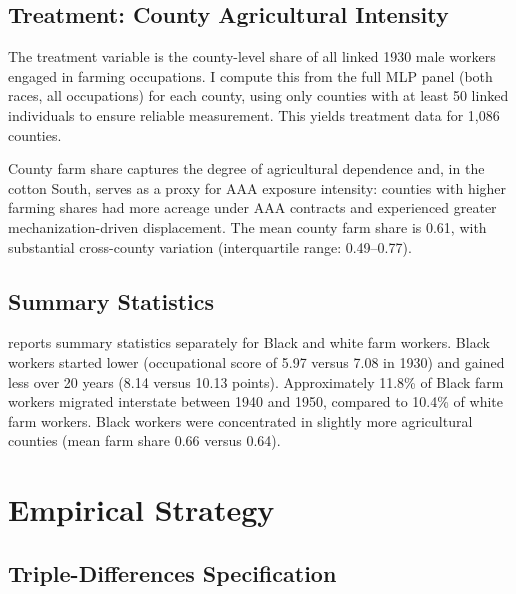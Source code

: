 \documentclass[12pt]{article}
\begin{document}
\subsection{Treatment: County Agricultural Intensity}

The treatment variable is the county-level share of all linked 1930 male workers engaged in farming occupations. I compute this from the full MLP panel (both races, all occupations) for each county, using only counties with at least 50 linked individuals to ensure reliable measurement. This yields treatment data for 1,086 counties.

County farm share captures the degree of agricultural dependence and, in the cotton South, serves as a proxy for AAA exposure intensity: counties with higher farming shares had more acreage under AAA contracts and experienced greater mechanization-driven displacement. The mean county farm share is 0.61, with substantial cross-county variation (interquartile range: 0.49--0.77).

\subsection{Summary Statistics}



 reports summary statistics separately for Black and white farm workers. Black workers started lower (occupational score of 5.97 versus 7.08 in 1930) and gained less over 20 years (8.14 versus 10.13 points). Approximately 11.8\% of Black farm workers migrated interstate between 1940 and 1950, compared to 10.4\% of white farm workers. Black workers were concentrated in slightly more agricultural counties (mean farm share 0.66 versus 0.64).

\section{Empirical Strategy}
\label{sec:strategy}

\subsection{Triple-Differences Specification}
\end{document}
